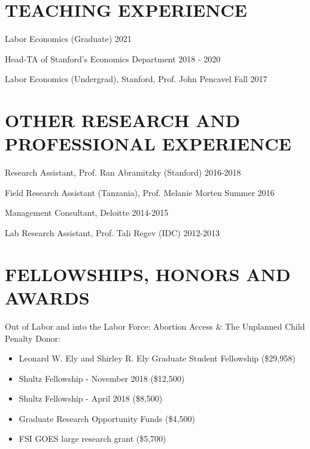 \documentclass[margin]{res} %
\begin{document}
\begin{resume}
\section{TEACHING EXPERIENCE}

Labor Economics (Graduate) \hfill 2021

 Head-TA of Stanford's Economics Department \hfill 2018 - 2020

 Labor Economics (Undergrad), Stanford, Prof. John Pencavel \hfill Fall 2017

 
\section{OTHER RESEARCH AND PROFESSIONAL EXPERIENCE}
 Research Assistant, Prof. Ran Abramitzky (Stanford) \hfill 2016-2018

 Field Research Assistant (Tanzania), Prof. Melanie Morten \hfill Summer 2016
 
 Management Consultant, Deloitte \hfill 2014-2015 

 Lab Research Assistant, Prof. Tali Regev (IDC) \hfill 2012-2013


\section{FELLOWSHIPS, HONORS AND AWARDS}

Out of Labor and into the Labor Force: Abortion Access \& The Unplanned Child Penalty
Donor: 
\begin{itemize}
	\item Leonard W. Ely and Shirley R. Ely Graduate Student Fellowship (\$29,958)
	\item Shultz Fellowship - November 2018 (\$12,500)
    \item Shultz Fellowship - April 2018 (\$8,500)
    \item Graduate Research Opportunity Funds (\$4,500)
    \item FSI GOES large research grant (\$5,700)
\end{itemize}	


\end{resume}
\end{document}
